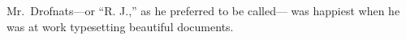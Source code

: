 \hsize 1.5in  
Mr.~Drofnats---or ``R. J.,'' as
he preferred to be called---%
was happiest when he was at work
typesetting beautiful documents.
\bye
